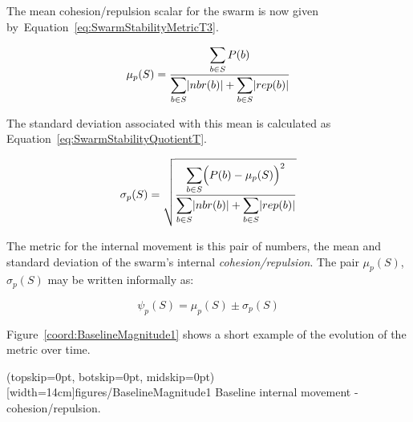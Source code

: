 \documentclass{ieeeaccess}
\begin{document}
The mean cohesion/repulsion scalar for the swarm is now given
by~Equation~\ref{eq:SwarmStabilityMetricT3}.  

\begin{equation}
\label{eq:SwarmStabilityMetricT3}
\mu_p(S) = \frac{\mathlarger{\sum_{b \in S} P(b)}}{\mathlarger{\sum_{b \in S}}|nbr(b)| + \mathlarger{\sum_{b \in S}}|rep(b)|}
\end{equation}


The standard deviation associated with this mean is calculated as
Equation~\ref{eq:SwarmStabilityQuotientT}.


\begin{equation}
\label{eq:SwarmStabilityQuotientT}
\sigma_p(S) = \sqrt{\frac{\mathlarger{\sum_{b \in S}}\Big(P(b)-\mu_p(S)\Big)^2}{\mathlarger{\sum_{b \in S}}|nbr(b)| + \mathlarger{\sum_{b \in S}}|rep(b)|}}
\end{equation}

The metric for the internal movement is this pair of numbers, the mean and
standard deviation of the swarm's internal \textit{cohesion/repulsion}. The
pair $\mu_p(S)$, $\sigma_p(S)$ may be written informally as: 

\begin{equation}
\label{eq:SwarmPotentialMagnitude}
\psi_p(S) = \mu_p(S)\pm \sigma_p(S)
\end{equation}

Figure~\ref{coord:BaselineMagnitude1} shows a short example of the evolution of
the metric over time.

\Figure[t!](topskip=0pt, botskip=0pt, midskip=0pt)[width=14cm]{figures/BaselineMagnitude1}
{Baseline internal movement - cohesion/repulsion.\label{coord:BaselineMagnitude1}}

\end{document}
